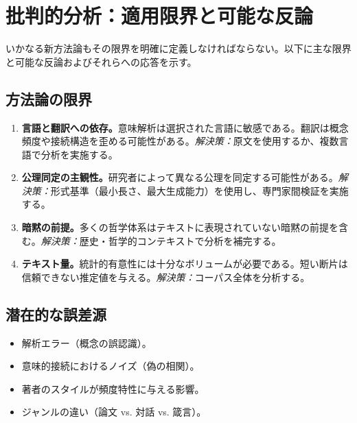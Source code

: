 \documentclass[11pt,a4paper]{article}
\begin{document}
	
	\section{批判的分析：適用限界と可能な反論}
	\label{sec:critical-analysis}
	
	いかなる新方法論もその限界を明確に定義しなければならない。以下に主な限界と可能な反論およびそれらへの応答を示す。
	
	\subsection{方法論の限界}
	
	\begin{enumerate}
		\item \textbf{言語と翻訳への依存。}意味解析は選択された言語に敏感である。翻訳は概念頻度や接続構造を歪める可能性がある。\textit{解決策：}原文を使用するか、複数言語で分析を実施する。
		\item \textbf{公理同定の主観性。}研究者によって異なる公理を同定する可能性がある。\textit{解決策：}形式基準（最小長さ、最大生成能力）を使用し、専門家間検証を実施する。
		\item \textbf{暗黙の前提。}多くの哲学体系はテキストに表現されていない暗黙の前提を含む。\textit{解決策：}歴史・哲学的コンテキストで分析を補完する。
		\item \textbf{テキスト量。}統計的有意性には十分なボリュームが必要である。短い断片は信頼できない推定値を与える。\textit{解決策：}コーパス全体を分析する。
	\end{enumerate}
	
	\subsection{潜在的な誤差源}
	
	\begin{itemize}
		\item 解析エラー（概念の誤認識）。
		\item 意味的接続におけるノイズ（偽の相関）。
		\item 著者のスタイルが頻度特性に与える影響。
		\item ジャンルの違い（論文 vs. 対話 vs. 箴言）。
	\end{itemize}
	
\end{document}
